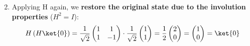 \begin{examplebox}
\begin{enumerate}
\begin{equation*}
        \end{equation*}
        \item Applying H again, we \textbf{restore the original state due to the involution properties} ($H^{2} = I$):
        \begin{equation*}
            H\left(H\ket{0}\right) =
            \dfrac{1}{\sqrt{2}}
            \begin{pmatrix}
                1 & 1 \\
                1 & -1
            \end{pmatrix}
            \cdot
            \dfrac{1}{\sqrt{2}}
            \begin{pmatrix}
                1 \\
                1
            \end{pmatrix}
            =
            \dfrac{1}{2}
            \begin{pmatrix}
                2 \\
                0
            \end{pmatrix}
            =
            \begin{pmatrix}
                1 \\
                0
            \end{pmatrix}
            =
            \ket{0}
        \end{equation*}
    \end{enumerate}
\end{examplebox}
